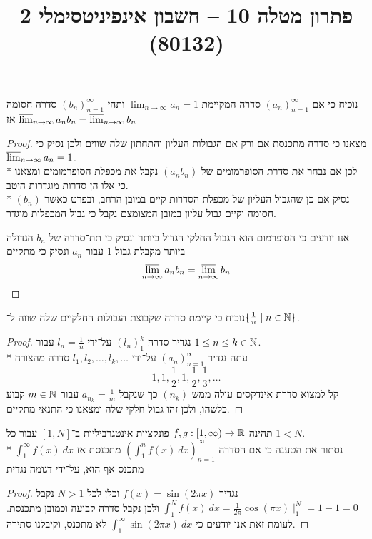 
\usepackage{tikz}
\DeclareMathOperator\arcsinh{arcsinh}
\title{פתרון מטלה 10 – חשבון אינפיניטסימלי 2 (80132)}


\maketitle
\maketitleprint{}

\Question{}
\Subquestion{}
נוכיח כי אם ${(a_n)}_{n = 1}^\infty$ סדרה המקיימת $\lim_{n \to \infty} a_n = 1$ ותהי ${(b_n)}_{n = 1}^\infty$ סדרה חסומה אז $\operatorname*{\overline{lim}}_{n \to \infty} a_n b_n = \operatorname*{\overline{lim}}_{n \to \infty} b_n$
\begin{proof}
	מצאנו כי סדרה מתכנסת אם ורק אם הגבולות העליון והתחתון שלה שווים ולכן נסיק כי $\operatorname*{\overline{lim}}_{n \to \infty} a_n = 1$. \\*
	לכן אם נבחר את סדרת הסופרמומים של $(a_n b_n)$ נקבל את מכפלת הסופרמומים ומצאנו כי אלו הן סדרות מוגדרות היטב. \\*
	נסיק אם כן שהגבול העליון של מכפלת הסדרות קיים במובן הרחב, ובפרט כאשר $(b_n)$ חסומה וקיים גבול עליון במובן המצומצם נקבל כי גבול המכפלות מוגדר.

	אנו יודעים כי הסופרמום הוא הגבול החלקי הגדול ביותר ונסיק כי תת־סדרה של $b_n$ הגדולה ביותר מקבלת גבול $1$ עבור $a_n$ ונסיק כי מתקיים
	\[
		\operatorname*{\overline{lim}}_{n \to \infty} a_n b_n = \operatorname*{\overline{lim}}_{n \to \infty} b_n
	\]
\end{proof}

\Subquestion{}
נוכיח כי קיימת סדרה שקבוצת הגבולות החלקיים שלה שווה ל־$\{ \frac{1}{n} \mid n \in \mathbb{N} \}$.
\begin{proof}
	נגדיר סדרה ${(l_n)}_1^k$ על־ידי $l_n = \frac{1}{n}$ עבור $1 \le n \le k \in \mathbb{N}$. \\*
	עתה נגדיר ${(a_n)}_{n = 1}^\infty$ על־ידי $l_1, l_2, \dots, l_k, \dots$ סדרה מהצורה
	\[
		1,
		1, \frac{1}{2},
		1, \frac{1}{2}, \frac{1}{3},
		\dots
	\]
	קל למצוא סדרת אינדקסים עולה ממש $(n_k)$ כך שנקבל $a_{n_k} = \frac{1}{m}$ עבור $m \in \mathbb{N}$ קבוע כלשהו, ולכן זהו גבול חלקי שלה ומצאנו כי התנאי מתקיים.
\end{proof}

\Question{}
תהינה $f, g : [1, \infty) \to \mathbb{R}$ פונקציות אינטגרביליות ב־$[1, N]$ עבור כל $1 < N$. \\*
נסתור את הטענה כי אם הסדרה ${( \int_{1}^{n} f(x)\ dx)}_{n = 1}^\infty$ מתכנסת אז $\int_{1}^{\infty} f(x)\ dx$ מתכנס אף הוא, על־ידי דגומה נגדית
\begin{proof}
	נגדיר $f(x) = \sin(2\pi x)$ וכלן לכל $N > 1$ נקבל $\int_1^N f(x)\ dx = \frac{1}{2 \pi} \cos(\pi x) \mid_1^N = 1 - 1 = 0$ ולכן נקבל סדרה קבועה וכמובן מתכנסת.
	לעומת זאת אנו יודעים כי $\int_{1}^{\infty} \sin (2\pi x)\ dx$ לא מתכנס, וקיבלנו סתירה.
\end{proof}

